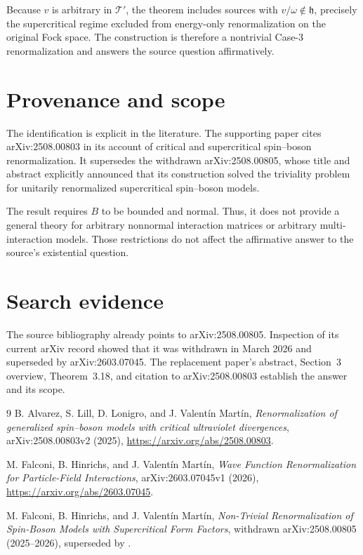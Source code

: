 \documentclass[11pt]{article}
\begin{document}
Because $v$ is arbitrary in $\mathcal T'$, the theorem includes sources with
$v/\omega\notin\mathfrak h$, precisely the supercritical regime excluded from
energy-only renormalization on the original Fock space.  The construction is
therefore a nontrivial Case-3 renormalization and answers the source question
affirmatively.

\section*{Provenance and scope}

The identification is explicit in the literature.  The supporting paper
cites arXiv:2508.00803 in its account of critical and supercritical
spin--boson renormalization.  It supersedes the withdrawn arXiv:2508.00805,
whose title and abstract explicitly announced that its construction solved
the triviality problem for unitarily renormalized supercritical spin--boson
models.

The result requires $B$ to be bounded and normal.  Thus, it does not provide a
general theory for arbitrary nonnormal interaction matrices or arbitrary
multi-interaction models.  Those restrictions do not affect the affirmative
answer to the source's existential question.

\section*{Search evidence}

The source bibliography already points to arXiv:2508.00805.  Inspection of its
current arXiv record showed that it was withdrawn in March 2026 and superseded
by arXiv:2603.07045.  The replacement paper's abstract, Section~3 overview,
Theorem~3.18, and citation to arXiv:2508.00803 establish the answer and its
scope.

\begin{thebibliography}{9}
B. Alvarez, S. Lill, D. Lonigro, and J. Valent\'in Mart\'in,
\emph{Renormalization of generalized spin--boson models with critical
ultraviolet divergences}, arXiv:2508.00803v2 (2025),
\url{https://arxiv.org/abs/2508.00803}.

M. Falconi, B. Hinrichs, and J. Valent\'in Mart\'in,
\emph{Wave Function Renormalization for Particle-Field Interactions},
arXiv:2603.07045v1 (2026),
\url{https://arxiv.org/abs/2603.07045}.

M. Falconi, B. Hinrichs, and J. Valent\'in Mart\'in,
\emph{Non-Trivial Renormalization of Spin-Boson Models with Supercritical
Form Factors}, withdrawn arXiv:2508.00805 (2025--2026), superseded by
\cite{answer}.
\end{thebibliography}
\end{document}

